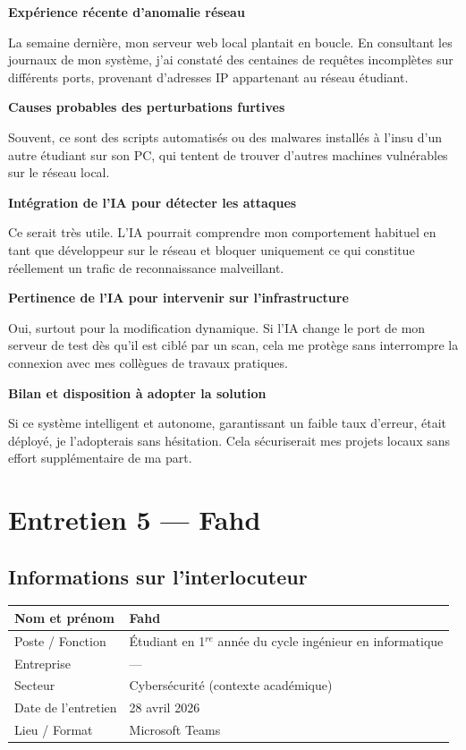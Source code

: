 \documentclass[12pt,a4paper]{report}
\begin{document}
\bigskip
\textbf{Expérience récente d'anomalie réseau}

La semaine derni\`{e}re, mon serveur web local plantait en boucle. En consultant les journaux de mon syst\`{e}me, j'ai constat\'{e} des centaines de requ\^{e}tes incompl\`{e}tes sur diff\'{e}rents ports, provenant d'adresses IP appartenant au r\'{e}seau \'{e}tudiant.

\bigskip
\textbf{Causes probables des perturbations furtives}

Souvent, ce sont des scripts automatis\'{e}s ou des malwares install\'{e}s \`{a} l'insu d'un autre \'{e}tudiant sur son PC, qui tentent de trouver d'autres machines vuln\'{e}rables sur le r\'{e}seau local.

\bigskip
\textbf{Intégration de l'IA pour détecter les attaques}

Ce serait tr\`{e}s utile. L'IA pourrait comprendre mon comportement habituel en tant que d\'{e}veloppeur sur le r\'{e}seau et bloquer uniquement ce qui constitue r\'{e}ellement un trafic de reconnaissance malveillant.

\bigskip
\textbf{Pertinence de l'IA pour intervenir sur l'infrastructure}

Oui, surtout pour la modification dynamique. Si l'IA change le port de mon serveur de test d\`{e}s qu'il est cibl\'{e} par un scan, cela me prot\`{e}ge sans interrompre la connexion avec mes coll\`{e}gues de travaux pratiques.

\bigskip
\textbf{Bilan et disposition à adopter la solution}

Si ce syst\`{e}me intelligent et autonome, garantissant un faible taux d'erreur, \'{e}tait d\'{e}ploy\'{e}, je l'adopterais sans h\'{e}sitation. Cela s\'{e}curiserait mes projets locaux sans effort suppl\'{e}mentaire de ma part.

\clearpage

\section{Entretien 5 --- Fahd}

\subsection*{Informations sur l'interlocuteur}

\begin{tabular}{@{}L{4cm} L{10.5cm}@{}}
  \hline
  Nom et pr\'{e}nom      & Fahd \\
  \hline
  Poste / Fonction   & \'{E}tudiant en 1$^{re}$ ann\'{e}e du cycle ing\'{e}nieur en informatique \\
  \hline
  Entreprise         & --- \\
  \hline
  Secteur            & Cybers\'{e}curit\'{e} (contexte acad\'{e}mique) \\
  \hline
  Date de l'entretien & 28 avril 2026 \\
  \hline
  Lieu / Format      & Microsoft Teams \\
  \hline
\end{tabular}
\end{document}
